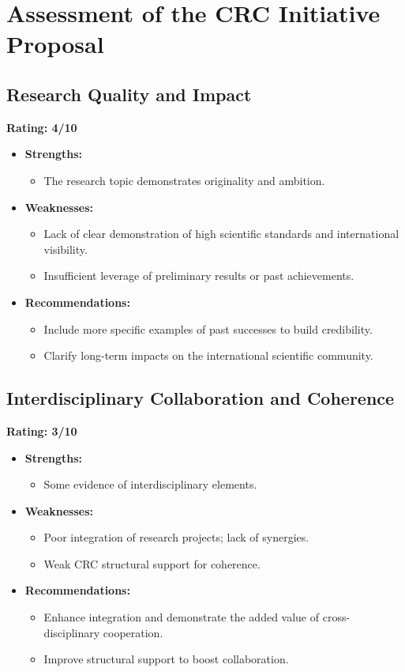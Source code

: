 \documentclass{article}
\begin{document}
\section{Assessment of the CRC Initiative Proposal}

\subsection{Research Quality and Impact}
\textbf{Rating: 4/10}
\begin{itemize}
    \item \textbf{Strengths:} 
    \begin{itemize}
        \item The research topic demonstrates originality and ambition. 
    \end{itemize}
    \item \textbf{Weaknesses:}
    \begin{itemize}
        \item Lack of clear demonstration of high scientific standards and international visibility.
        \item Insufficient leverage of preliminary results or past achievements.
    \end{itemize}
    \item \textbf{Recommendations:}
    \begin{itemize}
        \item Include more specific examples of past successes to build credibility.
        \item Clarify long-term impacts on the international scientific community.
    \end{itemize}
\end{itemize}

\subsection{Interdisciplinary Collaboration and Coherence}
\textbf{Rating: 3/10}
\begin{itemize}
    \item \textbf{Strengths:}
    \begin{itemize}
        \item Some evidence of interdisciplinary elements.
    \end{itemize}
    \item \textbf{Weaknesses:}
    \begin{itemize}
        \item Poor integration of research projects; lack of synergies.
        \item Weak CRC structural support for coherence.
    \end{itemize}
    \item \textbf{Recommendations:}
    \begin{itemize}
        \item Enhance integration and demonstrate the added value of cross-disciplinary cooperation.
        \item Improve structural support to boost collaboration.
    \end{itemize}
\end{itemize}
\end{document}
